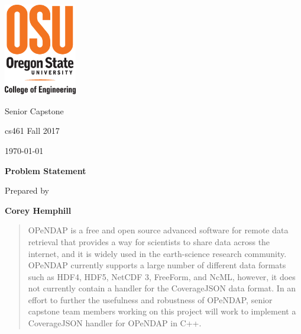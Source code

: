 \documentclass[onecolumn, draftclsnofoot,12pt, compsoc]{IEEEtran}
\def \GroupMemberOne{Corey Hemphill}
\def \HomeworkAssignmentOne{Problem Statement}
\def \DocType{	%
		Senior Capstone
		}
\begin{document}
\begin{titlepage}
    \begin{singlespace}
    	\includegraphics[height=4cm]{coe_v_spot1}
        \hfill  
        \par\vspace{.2in}
        \centering
        \scshape{
            \huge  \DocType \par
           	\huge cs461 Fall 2017 \par
            {\large\today}\par
            \vspace{.5in}
            \textbf{\Huge\HomeworkAssignmentOne}\par
            \vspace{.5in}
           
            {\large Prepared by }\par
           	\textbf{\GroupMemberOne}\par
   
            \vspace{5pt}
            }
            \vspace{120pt}
        
        \begin{abstract}
        OPeNDAP is a free and open source advanced software for remote data retrieval that 		    provides a way for scientists to share data across the internet, and it is widely 		 	used in the earth-science research community. OPeNDAP currently supports a large 			number of different data formats such as HDF4, HDF5, NetCDF 3, FreeForm, 		  			and NcML, however, it does not currently contain a handler for the CoverageJSON 			data format. In an effort to further the usefulness and robustness of OPeNDAP, 				senior capstone team members working on this project will work to implement a 				CoverageJSON handler for OPeNDAP in C++.
        \end{abstract} 
        
    \end{singlespace}
\end{titlepage}
\newpage
\end{document}
